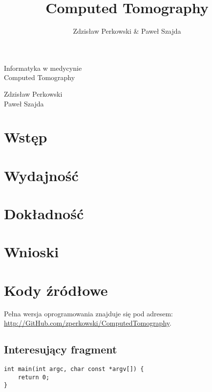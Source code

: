 \documentclass[12pt,a4paper]{article}
\author{Zdzisław Perkowski \& Paweł Szajda}
\title{Computed Tomography}
\begin{document}
\begin{center}
{\Huge Informatyka w medycynie\\ Computed Tomography\\}
\begin{large}
Zdzisław Perkowski\\
Paweł Szajda
\end{large}
\end{center}
\section{Wstęp}

\section{Wydajność}


\section{Dokładność}

\section{Wnioski}


\section{Kody źródłowe}
Pełna wersja oprogramowania znajduje się pod adresem: \\ \href{http://GitHub.com/zperkowski/ComputedTomography}{http://GitHub.com/zperkowski/ComputedTomography}.
\subsection{Interesujący fragment}
\begin{lstlisting}
int main(int argc, char const *argv[]) {
    return 0;
}
\end{lstlisting}
\end{document}
